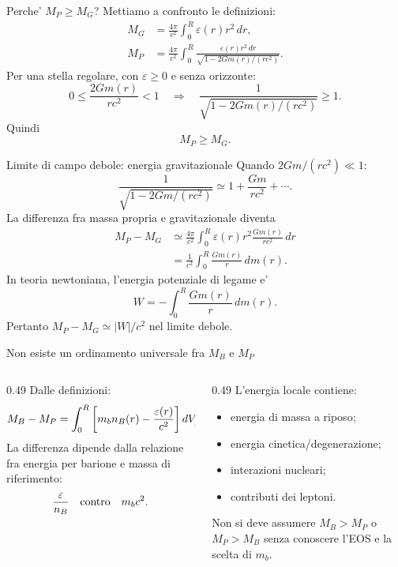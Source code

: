 \begin{frame}{Perche' $M_P\geq M_G$?}
\small
Mettiamo a confronto le definizioni:
\[
\begin{aligned}
M_G&=\frac{4\pi}{c^2}\int_0^R\varepsilon(r)r^2\,dr,\\[3pt]
M_P&=\frac{4\pi}{c^2}\int_0^R
\frac{\varepsilon(r)r^2\,dr}
{\sqrt{1-2Gm(r)/(rc^2)}}.
\end{aligned}
\]
Per una stella regolare, con $\varepsilon\geq0$ e senza orizzonte:
\[
0\leq\frac{2Gm(r)}{rc^2}<1
\quad\Longrightarrow\quad
\frac1{\sqrt{1-2Gm(r)/(rc^2)}}\geq1.
\]
Quindi
\[
M_P\geq M_G.
\]
\end{frame}

\begin{frame}{Limite di campo debole: energia gravitazionale}
\footnotesize
Quando $2Gm/(rc^2)\ll1$:
\[
\frac1{\sqrt{1-2Gm/(rc^2)}}
\simeq1+\frac{Gm}{rc^2}+\cdots.
\]
La differenza fra massa propria e gravitazionale diventa
\[
\begin{aligned}
M_P-M_G
&\simeq\frac{4\pi}{c^2}\int_0^R
\varepsilon(r)r^2\frac{Gm(r)}{rc^2}\,dr\\
&=\frac1{c^2}\int_0^R\frac{Gm(r)}{r}\,dm(r).
\end{aligned}
\]
In teoria newtoniana, l'energia potenziale di legame e'
\[
W=-\int_0^R\frac{Gm(r)}{r}\,dm(r).
\]
Pertanto $M_P-M_G\simeq |W|/c^2$ nel limite debole.
\end{frame}

\begin{frame}{Non esiste un ordinamento universale fra $M_B$ e $M_P$}
\small
\begin{columns}[T,onlytextwidth]
\begin{column}{0.49\textwidth}
Dalle definizioni:
\[
M_B-M_P=
\int_0^R\left[m_bn_B(r)-\frac{\varepsilon(r)}{c^2}\right]
dV_{\rm prop}.
\]
La differenza dipende dalla relazione
fra energia per barione e massa di riferimento:
\[
\frac{\varepsilon}{n_B}
\quad\hbox{contro}\quad m_bc^2.
\]
\end{column}
\begin{column}{0.49\textwidth}
L'energia locale contiene:
\begin{itemize}
\item energia di massa a riposo;
\item energia cinetica/degenerazione;
\item interazioni nucleari;
\item contributi dei leptoni.
\end{itemize}
\medskip
Non si deve assumere $M_B>M_P$
o $M_P>M_B$ senza conoscere l'EOS
e la scelta di $m_b$.
\end{column}
\end{columns}
\end{frame}

